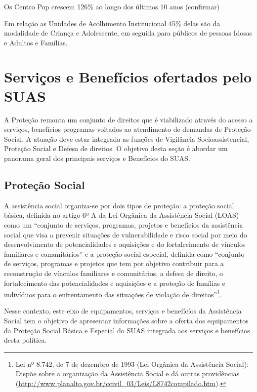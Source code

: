 \documentclass[
  brazilian]{report}
\begin{document}
Os Centro Pop crescem 126\% ao longo dos últimos 10 anos (confirmar)

Em relação as Unidades de Acolhimento Institucional 45\% delas são da
modalidade de Criança e Adolescente, em seguida para públicos de pessoas
Idosas e Adultos e Famílias.

\hypertarget{serviuxe7os-e-benefuxedcios-ofertados-pelo-suas}{%
\chapter{Serviços e Benefícios ofertados pelo
SUAS}\label{serviuxe7os-e-benefuxedcios-ofertados-pelo-suas}}

A Proteção remonta um conjunto de direitos que é viabilizado através do
acesso a serviços, benefícios programas voltados ao atendimento de
demandas de Proteção Social. A atuação deve estar integrada as funções
de Vigilância Socioassistencial, Proteção Social e Defesa de direitos. O
objetivo desta seção é abordar um panorama geral dos principais serviços
e Benefícios do SUAS.

\hypertarget{proteuxe7uxe3o-social}{%
\section{Proteção Social}\label{proteuxe7uxe3o-social}}

A assistência social organiza-se por dois tipos de proteção: a proteção
social básica, definida no artigo 6º-A da Lei Orgânica da Assistência
Social (LOAS) como um ``conjunto de serviços, programas, projetos e
benefícios da assistência social que visa a prevenir situações de
vulnerabilidade e risco social por meio do desenvolvimento de
potencialidades e aquisições e do fortalecimento de vínculos familiares
e comunitários'' e a proteção social especial, definida como ``conjunto
de serviços, programas e projetos que tem por objetivo contribuir para a
reconstrução de vínculos familiares e comunitários, a defesa de direito,
o fortalecimento das potencialidades e aquisições e a proteção de
famílias e indivíduos para o enfrentamento das situações de violação de
direitos''\footnote{Lei nº 8.742, de 7 de dezembro de 1993 (Lei Orgânica da Assistência Social): Dispõe sobre a organização da Assistência Social e dá outras providências (\url{http://www.planalto.gov.br/ccivil_03/Leis/L8742compilado.htm}).}.

Nesse contexto, este eixo de equipamentos, serviços e benefícíos da
Assistência Social tem o objetivo de apresentar informações sobre a
oferta dos equipamentos da Proteção Social Básica e Especial do SUAS
integrada aos serviços e benefícios desta política.
\end{document}
